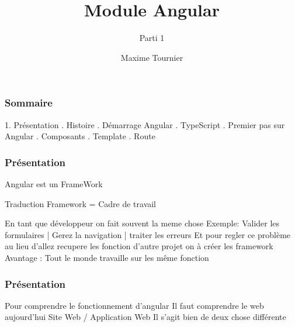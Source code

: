 \documentclass[10pt]{beamer}
\title[Angular]
{Module Angular}
\subtitle{Parti 1}
\author[Maxime Tournier]
{Maxime Tournier}
\date[21/08/2023]
\begin{document}
	\frame{\titlepage}

	\begin{frame}
		\frametitle{Sommaire}

		1. {Présentation} . {Histoire} . {Démarrage Angular} . {TypeScript} . {Premier pas sur Angular} . {Composants} . {Template} . {Route} \newline

	\end{frame}


	\begin{frame}
		\frametitle{Présentation}
	
		Angular est un \alert{FrameWork}

		\begin{block}{Traduction}
			Framework = Cadre de travail
		\end{block}

		En tant que développeur on fait souvent la meme chose \newline \newline
		Exemple: \newline Valider les formulaires | Gerez la navigation | traiter les erreurs
		\newline \newline
		Et pour regler ce problème au lieu d'allez recupere les fonction d'autre projet on à créer les framework
		\newline \newline
		Avantage : Tout le monde travaille sur les même fonction
		
	\end{frame}

	\begin{frame}
		\frametitle{Présentation}

		Pour comprendre le fonctionnement d'angular
		\newline \newline
		Il faut comprendre le web aujourd'hui
		\newline \newline
		Site Web / Application Web
		\newline \newline
		Il s'agit bien de deux chose différente

	\end{frame}
\end{document}
